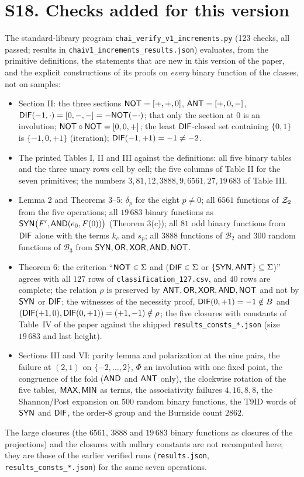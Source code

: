 \documentclass[10pt,a4paper]{article}
\begin{document}
\section*{S18. Checks added for this version}
The standard-library program \texttt{chai\_verify\_v1\_increments.py} (123 checks, all passed; results in \texttt{chaiv1\_increments\_results.json}) evaluates, from the primitive definitions, the statements that are new in this version of the paper, and the explicit constructions of its proofs on \emph{every} binary function of the classes, not on samples:
\begin{itemize}\setlength\itemsep{0pt}
\item Section II: the three sections $\mathsf{NOT}=[+,+,0]$, $\mathsf{ANT}=[+,0,-]$, $\mathsf{DIF}(-1,\cdot)=[0,-,-]=-\mathsf{NOT}(-\cdot)$; that only the section at $0$ is an involution; $\mathsf{NOT}\circ\mathsf{NOT}=[0,0,+]$; the least $\mathsf{DIF}$-closed set containing $\{0,1\}$ is $\{-1,0,+1\}$ (iteration); $\mathsf{DIF}(-1,+1)=-1\ne-2$.
\item The printed Tables I, II and III against the definitions: all five binary tables and the three unary rows cell by cell; the five columns of Table II for the seven primitives; the numbers $3,81,12,3888,9,6561,27,19\,683$ of Table III.
\item Lemma 2 and Theorems 3--5: $\delta_p$ for the eight $p\ne0$; all $6561$ functions of $\mathcal Z_2$ from the five operations; all $19\,683$ binary functions as $\mathsf{SYN}\big(F',\mathsf{AND}(e_0,F(0))\big)$ (Theorem 3(c)); all $81$ odd binary functions from $\mathsf{DIF}$ alone with the terms $k_c$ and $s_p$; all $3888$ functions of $\mathcal B_2$ and $300$ random functions of $\mathcal B_3$ from $\mathsf{SYN},\mathsf{OR},\mathsf{XOR},\mathsf{AND},\mathsf{NOT}$.
\item Theorem 6: the criterion ``$\mathsf{NOT}\in\Sigma$ and ($\mathsf{DIF}\in\Sigma$ or $\{\mathsf{SYN},\mathsf{ANT}\}\subseteq\Sigma$)'' agrees with all $127$ rows of \texttt{classification\_127.csv}, and $40$ rows are complete; the relation $\rho$ is preserved by $\mathsf{ANT},\mathsf{OR},\mathsf{XOR},\mathsf{AND},\mathsf{NOT}$ and not by $\mathsf{SYN}$ or $\mathsf{DIF}$; the witnesses of the necessity proof, $\mathsf{DIF}(0,+1)=-1\notin B$ and $(\mathsf{DIF}(+1,0),\mathsf{DIF}(0,+1))=(+1,-1)\notin\rho$; the five closures with constants of Table~IV of the paper against the shipped \texttt{results\_consts\_*.json} (size $19\,683$ and last height).
\item Sections III and VI: parity lemma and polarization at the nine pairs, the failure at $(2,1)$ on $\{-2,\dots,2\}$, $\Phi$ an involution with one fixed point, the congruence of the fold ($\mathsf{AND}$ and $\mathsf{ANT}$ only), the clockwise rotation of the five tables, $\mathsf{MAX},\mathsf{MIN}$ as terms, the associativity failures $4,16,8,8$, the Shannon/Post expansion on $500$ random binary functions, the T9ID words of $\mathsf{SYN}$ and $\mathsf{DIF}$, the order-$8$ group and the Burnside count $2862$.
\end{itemize}
The large closures (the $6561$, $3888$ and $19\,683$ binary functions as closures of the projections) and the closures with nullary constants are not recomputed here; they are those of the earlier verified runs (\texttt{results.json}, \texttt{results\_consts\_*.json}) for the same seven operations.
\end{document}
